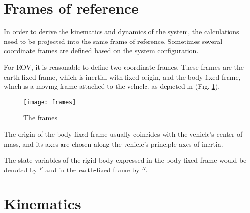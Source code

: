 \section{Frames of reference}

    In order to derive the kinematics and dynamics of the system, the calculations need to be projected into 
    the same frame of reference. 
    Sometimes several coordinate frames are defined based on the system configuration. 
    
    For ROV, it is reasonable to define two coordinate frames. 
    These frames are the earth-fixed frame, which is inertial with fixed origin, and the body-fixed frame, 
    which is a moving frame attached to the vehicle. as depicted in (Fig. \ref{image:frames}). 
    \begin{figure}[H]
        \centering\texttt{[image: frames]}
        \caption{The frames}
        \label{image:frames}
    \end{figure}

    The origin of the body-fixed frame usually coincides with the vehicle's center of mass,
     and its axes are chosen along the vehicle's principle axes of inertia.

    The state variables of the rigid body expressed in the body-fixed frame would be 
    denoted by $^B$ and in the earth-fixed frame by $^N$.

\section{Kinematics}

